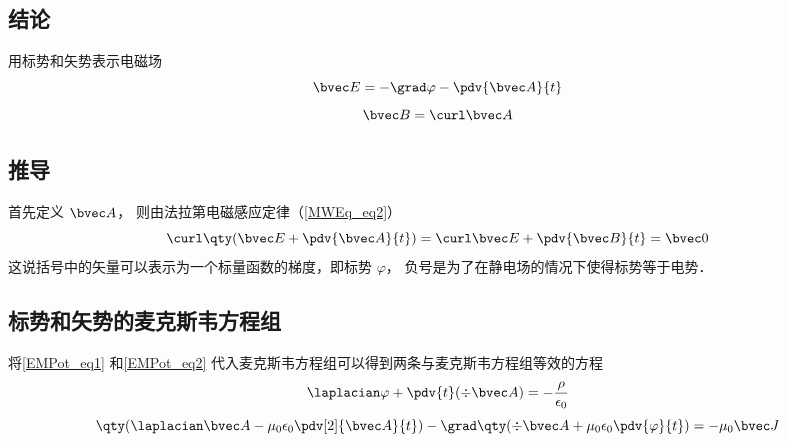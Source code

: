 \subsection{结论}
用标势和矢势表示电磁场
\begin{equation}\label{EMPot_eq1}
\bvec E = -\grad \varphi - \pdv{\bvec A}{t}
\end{equation}
\begin{equation}\label{EMPot_eq2}
\bvec B = \curl \bvec A
\end{equation}

\subsection{推导}
首先定义 $\bvec A$， 则由法拉第电磁感应定律（\autoref{MWEq_eq2}）
\begin{equation}
\curl \qty(\bvec E + \pdv{\bvec A}{t}) = \curl \bvec E + \pdv{\bvec B}{t} = \bvec 0
\end{equation}
这说括号中的矢量可以表示为一个标量函数的梯度，即标势 $\varphi$， 负号是为了在静电场的情况下使得标势等于电势．

\subsection{标势和矢势的麦克斯韦方程组}

将\autoref{EMPot_eq1} 和\autoref{EMPot_eq2} 代入麦克斯韦方程组可以得到两条与麦克斯韦方程组等效的方程
\begin{equation}\label{EMPot_eq4}
\laplacian \varphi + \pdv{t} (\div \bvec A) = -\frac{\rho}{\epsilon_0}
\end{equation}
\begin{equation}\label{EMPot_eq5}
\qty(\laplacian \bvec A - \mu_0\epsilon_0 \pdv[2]{\bvec A}{t}) - \grad \qty(\div \bvec A + \mu_0\epsilon_0 \pdv{\varphi}{t}) = -\mu_0\bvec J
\end{equation}

